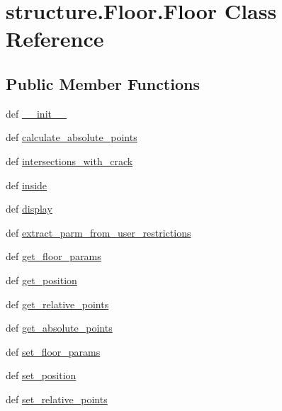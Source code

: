\hypertarget{classstructure_1_1_floor_1_1_floor}{\section{structure.\-Floor.\-Floor Class Reference}
\label{classstructure_1_1_floor_1_1_floor}
}
\subsection*{Public Member Functions}
\begin{DoxyCompactItemize}
\item 
def \hyperlink{classstructure_1_1_floor_1_1_floor_aa6b9e83ee0ab8c69bb619d11279ece40}{\-\_\-\-\_\-init\-\_\-\-\_\-}
\item 
def \hyperlink{classstructure_1_1_floor_1_1_floor_abbb3e1ac919b2113d9b3a10362f094a4}{calculate\-\_\-absolute\-\_\-points}
\item 
def \hyperlink{classstructure_1_1_floor_1_1_floor_ad8a28c16d17cfc57bea732ab600cc36f}{intersections\-\_\-with\-\_\-crack}
\item 
def \hyperlink{classstructure_1_1_floor_1_1_floor_aaca41f90841adcab513b7f899df534f1}{inside}
\item 
def \hyperlink{classstructure_1_1_floor_1_1_floor_a56504b4b66d7dbc5788211cd9ab78f9e}{display}
\item 
def \hyperlink{classstructure_1_1_floor_1_1_floor_a6543d5496fc6fa6b9bf3748659b7b14d}{extract\-\_\-parm\-\_\-from\-\_\-user\-\_\-restrictions}
\item 
def \hyperlink{classstructure_1_1_floor_1_1_floor_abda75539c62575846e13f28ff4a9497e}{get\-\_\-floor\-\_\-params}
\item 
def \hyperlink{classstructure_1_1_floor_1_1_floor_aea10d3e990f6d82f06c28353b5dfaaf2}{get\-\_\-position}
\item 
def \hyperlink{classstructure_1_1_floor_1_1_floor_a623eed738de37bd0f7817001c9b08d03}{get\-\_\-relative\-\_\-points}
\item 
def \hyperlink{classstructure_1_1_floor_1_1_floor_a721c1508add16fe02a15f7da2fb90787}{get\-\_\-absolute\-\_\-points}
\item 
def \hyperlink{classstructure_1_1_floor_1_1_floor_ae16e50becd6e6cacfa7d003296662b30}{set\-\_\-floor\-\_\-params}
\item 
def \hyperlink{classstructure_1_1_floor_1_1_floor_a2d18951ae4959bbd5a5a63c6015a3326}{set\-\_\-position}
\item 
def \hyperlink{classstructure_1_1_floor_1_1_floor_ad12771456a5715c69adec72a9f272d01}{set\-\_\-relative\-\_\-points}

\end{DoxyCompactItemize}
